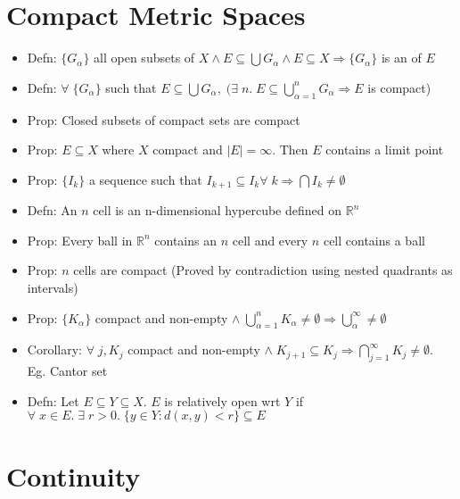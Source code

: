 \documentclass[a4paper]{article}
\newcommand{\boxinate}[1]{\framebox[1.1\width]{#1}}
\begin{document}
\section{Compact Metric Spaces} %
\begin{itemize}
\item Defn: $\{G_{\alpha}\}$ all open subsets of $X \land E \subseteq \bigcup G_{\alpha} \land E \subseteq X \Rightarrow \{G_{\alpha}\}$ is an \boxinate{open cover} of $E$
\item Defn: $\forall\;\{G_{\alpha}\}$ such that $E \subseteq \bigcup G_{\alpha}
  ,\;(\exists\;n.\; E \subseteq \bigcup_{\alpha = 1}^n G_{\alpha} \Rightarrow E$ is compact)
\item Prop: Closed subsets of compact sets are compact
\item Prop: $E \subseteq X$ where $X$ compact and $|E| = \infty$. Then $E$ contains a limit point
\item Prop: $\{I_k\}$ a sequence such that $I_{k+1} \subseteq I_k \forall\;k \Rightarrow \bigcap I_k \neq \emptyset$
\item Defn: An $n$ cell is an n-dimensional hypercube defined on $\mathbb{R}^n$
\item Prop: Every ball in $\mathbb{R}^n$ contains an $n$ cell and every $n$ cell contains a ball
\item Prop: $n$ cells are compact (Proved by contradiction using nested quadrants as intervals)
\item Prop: $\{K_{\alpha}\}$ compact and non-empty $\land\; \bigcup_{\alpha = 1}^n K_{\alpha} \neq \emptyset \Rightarrow \bigcup_{\alpha}^{\infty} \neq \emptyset$
\item Corollary: $\forall\;j, K_j$ compact and non-empty $\land \;K_{j+1} \subseteq K_j \Rightarrow \bigcap_{j=1}^{\infty} K_j \neq \emptyset$. Eg. Cantor set
\item Defn: Let $E \subseteq Y \subseteq X$. $E$ is relatively open wrt $Y$ if $\forall\;x \in E.\;\exists\;r > 0.\;\{y \in Y: d(x, y) < r\} \subseteq E$
\end{itemize}

\section{Continuity}
\end{document}

